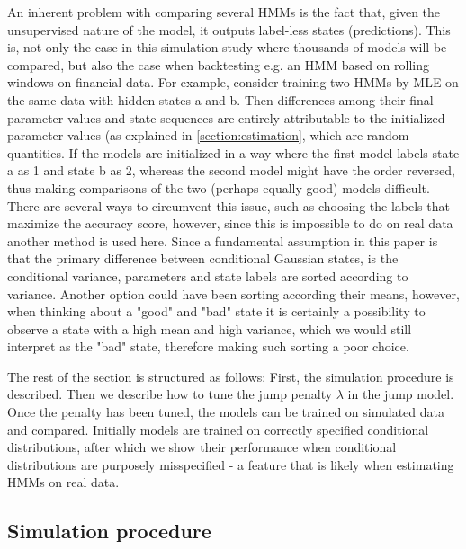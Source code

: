 An inherent problem with comparing several HMMs is the fact that, given the unsupervised nature of the model, it outputs label-less states (predictions). This is, not only the case in this simulation study where thousands of models will be compared, but also the case when backtesting e.g. an HMM based on rolling windows on financial data. For example, consider training two HMMs by MLE on the same data with hidden states a and b. Then differences among their final parameter values and state sequences are entirely attributable to the initialized parameter values (as explained in \cref{section:estimation}, which are random quantities. If the models are initialized in a way where the first model labels state a as 1 and state b as 2, whereas the second model might have the order reversed, thus making comparisons of the two (perhaps equally good) models difficult. There are several ways to circumvent this issue, such as choosing the labels that maximize the accuracy score, however, since this is impossible to do on real data another method is used here. Since a fundamental assumption in this paper is that the primary difference between conditional Gaussian states, is the conditional variance, parameters and state labels are sorted according to variance. Another option could have been sorting according their means, however, when thinking about a "good" and "bad" state it is certainly a possibility to observe a state with a high mean and high variance, which we would still interpret as the "bad" state, therefore making such sorting a poor choice.

The rest of the section is structured as follows: First, the simulation procedure is described. Then we describe how to tune the jump penalty $\lambda$ in the jump model. Once the penalty has been tuned, the models can be trained on simulated data and compared. Initially models are trained on correctly specified conditional distributions, after which we show their performance when conditional distributions are purposely misspecified - a feature that is likely when estimating HMMs on real data.

\subsection{Simulation procedure}

